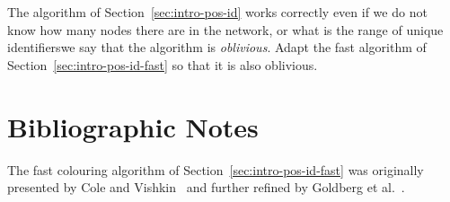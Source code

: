 \begin{exs}
    The algorithm of Section~\ref{sec:intro-pos-id} works correctly even if we do not know how many nodes there are in the network, or what is the range of unique identifiers\mydash we say that the algorithm is \emph{oblivious}. Adapt the fast algorithm of Section~\ref{sec:intro-pos-id-fast} so that it is also oblivious.
\end{exs}


\section{Bibliographic Notes}

The fast colouring algorithm of Section~\ref{sec:intro-pos-id-fast} was originally presented by Cole and Vishkin~\cite{cole86deterministic} and further refined by Goldberg et al.~\cite{goldberg88parallel}.
